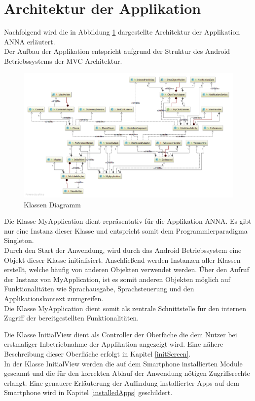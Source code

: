 \section{Architektur der Applikation}
Nachfolgend wird die in Abbildung \ref{figClassDiagram} dargestellte Architektur der Applikation \ac{ANNA} erläutert.\\
Der Aufbau der Applikation entspricht aufgrund der Struktur des Android Betriebssystems der \ac{MVC} Architektur.

\begin{figure}[h]
\hspace*{-2.2cm}
  \includegraphics[scale=0.5]{images/diagram.png}
	\caption{Klassen Diagramm}
	\label{figClassDiagram}
\end{figure}

Die Klasse MyApplication dient repräsentativ für die Applikation \ac{ANNA}. Es gibt nur eine Instanz dieser Klasse und entspricht somit dem Programmierparadigma Singleton.\\
Durch den Start der Anwendung, wird durch das Android Betriebssystem eine Objekt dieser Klasse initialisiert. Anschließend werden Instanzen aller Klassen erstellt, welche häufig von anderen Objekten verwendet werden. Über den Aufruf der Instanz von MyApplication, ist es somit anderen Objekten möglich auf Funktionalitäten wie Sprachausgabe, Sprachsteuerung und den Applikationskontext zuzugreifen.\\
Die Klasse MyApplication dient somit als zentrale Schnittstelle für den internen Zugriff der bereitgestellten Funktionalitäten.

Die Klasse InitialView dient als Controller der Oberfäche die dem Nutzer bei erstmaliger Inbetriebnahme der Applikation angezeigt wird. Eine nähere Beschreibung dieser Oberfläche erfolgt in Kapitel \ref{initScreen}.\\
In der Klasse InitialView werden die auf dem Smartphone installierten Module gescannt und die für den korrekten Ablauf der Anwendung nötigen Zugriffsrechte erlangt. Eine genauere Erläuterung der Auffindung installierter Apps auf dem Smartphone wird in Kapitel \ref{installedApps} geschildert.

